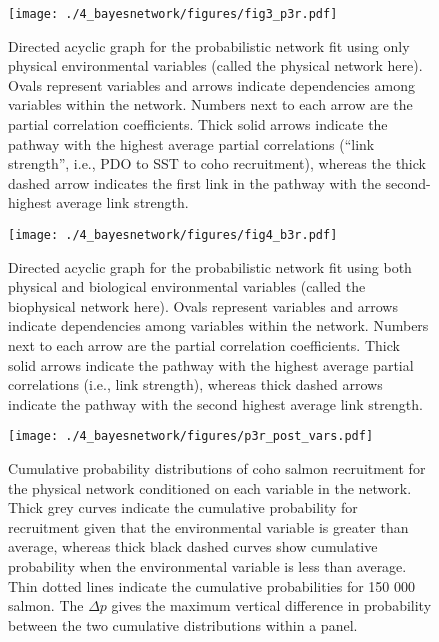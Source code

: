 \begin{figure}[htbp]
  \centering \texttt{[image: ./4\_bayesnetwork/figures/fig3\_p3r.pdf]}
  \caption[Directed acyclic graph for the probabilistic network fit using only
    physical environmental variables.]{Directed acyclic graph for the
    probabilistic network fit using only
    physical environmental variables (called the physical network here). Ovals
    represent variables and arrows indicate dependencies among variables within
    the network. Numbers next to each arrow are the partial correlation
    coefficients. Thick solid arrows indicate the pathway with the highest
    average partial correlations (``link strength'', i.e., PDO to SST to coho
    recruitment), whereas the thick dashed arrow indicates the first link in the
    pathway with the second-highest average link strength.}
  \label{fig:bn:4}
\end{figure}

\begin{figure}[htbp]
  \centering \texttt{[image: ./4\_bayesnetwork/figures/fig4\_b3r.pdf]}
  \caption[Directed acyclic graph for the probabilistic network fit using both
    physical and biological environmental variables.]{Directed acyclic graph for
    the probabilistic network fit using both physical and biological
    environmental variables (called the biophysical
    network here). Ovals represent variables and arrows indicate dependencies
    among variables within the network. Numbers next to each arrow are the
    partial correlation coefficients. Thick solid arrows indicate the pathway
    with the highest average partial correlations (i.e., link strength), whereas
    thick dashed arrows indicate the pathway with the second highest average
    link strength.}
  \label{fig:bn:5}
\end{figure}

\begin{figure}[htbp]
  \centering \texttt{[image: ./4\_bayesnetwork/figures/p3r\_post\_vars.pdf]}
  \caption[Cumulative probability distributions of coho salmon recruitment for
    the physical network conditioned on each variable in the
    network.]{Cumulative probability distributions of coho salmon recruitment for
    the physical network conditioned on each variable in the network. Thick grey
    curves indicate the cumulative probability for recruitment given that the
    environmental variable is greater than average, whereas thick black dashed
    curves show cumulative probability when the environmental variable is less
    than average. Thin dotted lines indicate the cumulative probabilities for
    150 000 salmon. The \(\Delta p\) gives the maximum vertical difference in
    probability between the two cumulative distributions within a panel.}
  \label{fig:bn:6}
\end{figure}

